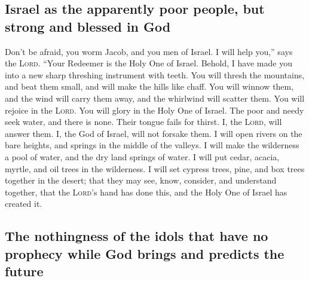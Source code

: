 \hypertarget{israel-as-the-apparently-poor-people-but-strong-and-blessed-in-god}{%
\subsection{Israel as the apparently poor people, but strong and blessed
in
God}\label{israel-as-the-apparently-poor-people-but-strong-and-blessed-in-god}}

 Don't be afraid, you worm Jacob, and you men of Israel.
I will help you,'' says the \textsc{Lord}. ``Your Redeemer is the Holy
One of Israel.  Behold, I have made you into a new sharp
threshing instrument with teeth. You will thresh the mountains, and beat
them small, and will make the hills like chaff.  You will
winnow them, and the wind will carry them away, and the whirlwind will
scatter them. You will rejoice in the \textsc{Lord}. You will glory in
the Holy One of Israel.  The poor and needy seek water,
and there is none. Their tongue fails for thirst. I, the \textsc{Lord},
will answer them. I, the God of Israel, will not forsake them.
 I will open rivers on the bare heights, and springs in
the middle of the valleys. I will make the wilderness a pool of water,
and the dry land springs of water.  I will put cedar,
acacia, myrtle, and oil trees in the wilderness. I will set cypress
trees, pine, and box trees together in the desert;  that
they may see, know, consider, and understand together, that the
\textsc{Lord}'s hand has done this, and the Holy One of Israel has
created it.

\hypertarget{the-nothingness-of-the-idols-that-have-no-prophecy-while-god-brings-and-predicts-the-future}{%
\subsection{The nothingness of the idols that have no prophecy while God
brings and predicts the
future}\label{the-nothingness-of-the-idols-that-have-no-prophecy-while-god-brings-and-predicts-the-future}}

